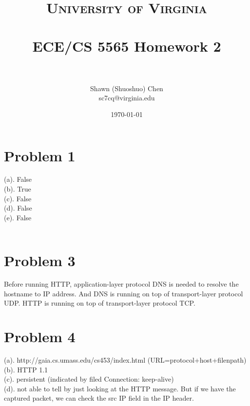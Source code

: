 \documentclass[titlepage, paper=a4, fontsize=11pt]{scrartcl} %
\title{	
\normalfont \normalsize 
\textsc{University of Virginia} \\ [25pt] %
\horrule{0.5pt} \\[0.4cm] %
\huge ECE/CS 5565 Homework 2 \\ %
\horrule{2pt} \\[0.5cm] %
}
\author{Shawn (Shuoshuo) Chen\\sc7cq@virginia.edu} %
\date{\normalsize\today} %
\numberwithin{equation}{section} %
\numberwithin{figure}{section} %
\numberwithin{table}{section} %
\begin{document}
\maketitle %


\section*{Problem 1}

(a). False \\
(b). True \\
(c). False \\
(d). False \\
(e). False \\
\\



\section*{Problem 3}
Before running HTTP, application-layer protocol DNS is needed to resolve the hostname to IP address.
And DNS is running on top of transport-layer protocol UDP. HTTP is running on top of transport-layer
protocol TCP.
\\



\section*{Problem 4}
(a). http://gaia.cs.umass.edu/cs453/index.html  (URL=protocol+host+filenpath) \\

(b). HTTP 1.1 \\

(c). persistent (indicated by filed Connection: keep-alive) \\

(d). not able to tell by just looking at the HTTP message. But if we have the captured packet, we can check the src IP field in the IP header. \\
\end{document}
